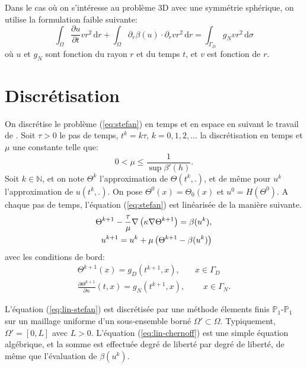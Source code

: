 Dans le cas o\`u on s'int\'eresse au probl\`eme 3D avec une
symm\'etrie sph\'erique, on utilise la formulation faible suivante:
\begin{equation}\label{eq:stefan-weak-spherical}
  \int_\Omega \frac{\partial u}{\partial t} vr^2\,\mathrm dr +
  \int_\Omega \partial_r \beta(u) \cdot \partial_r vr^2\,\mathrm dr =
  \int_{\Gamma_D} g_N vr^2 \, \mathrm d\sigma
\end{equation}
o\`u $u$ et $g_N$ sont fonction du rayon $r$ et du temps $t$, et $v$
est fonction de $r$.

\section{Discr\'etisation}\label{sec:discretisation}
On discr\'etise le probl\`eme (\ref{eq:stefan}) en temps et en espace
en suivant le travail de \cite{Paolini1988}. Soit $\tau > 0$ le pas de
temps, $t^k = k\tau$, $k = 0,1,2,\dots$ la discr\'etisation en temps
et $\mu$ une constante telle que:
\begin{equation}
0 < \mu \leq \frac{1}{\sup \beta'(h)}.
\end{equation}
Soit $k \in \mathbb N$, et on note $\Theta^k$ l'approximation de
$\Theta(t^k, .)$, et de m\^eme pour $u^k$
l'approximation de $u(t^k, .)$. On pose $\Theta^0(x) =
\Theta_0(x)$ et $u^0 = H(\Theta^0)$.  A chaque pas de temps,
l'\'equation (\ref{eq:stefan}) est lin\'earis\'ee de la mani\`ere
suivante.
\begin{align}
  \Theta^{k+1} - \frac{\tau}{\mu}\nabla\left( \kappa\nabla\Theta^{k+1} \right) = \beta(u^k),\label{eq:lin-stefan}\\
  u^{k+1} = u^{k} + \mu\left( \Theta^{k+1}-\beta(u^{k}) \right)\label{eq:lin-chernoff}
\end{align}
avec les conditions de bord:
\begin{align}
  \Theta^{k+1}(x) = g_D(t^{k+1}, x),\quad& x \in\Gamma_D\\
  \displaystyle\frac{\partial \Theta^{k+1}}{\partial n}(t, x) = g_N(t^{k+1}, x),&\quad x \in\Gamma_N.
\end{align}

L'\'equation (\ref{eq:lin-stefan}) est discr\'etis\'ee par une
m\'ethode \'elements finis $\mathbb P_1$-$\mathbb P_1$ sur un maillage
uniforme d'un sous-ensemble born\'e $\Omega' \subset
\Omega$. Typiquement, $\Omega' = [0, L]$ avec $L > 0$.  L'\'equation
(\ref{eq:lin-chernoff}) est une simple \'equation alg\'ebrique, et la
somme est effectu\'ee degr\'e de libert\'e par degr\'e de libert\'e,
de m\^eme que l'\'evaluation de $\beta(u^k)$.


